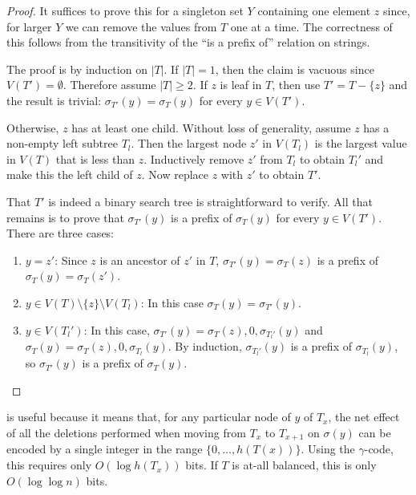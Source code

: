 \documentclass[kpfonts]{patmorin}
\begin{document}
\begin{proof}
  It suffices to prove this for a singleton set $Y$ containing one element $z$ since, for larger $Y$ we can remove the values from $T$ one at a time.  The correctness of this follows from the transitivity of the ``is a prefix of'' relation on strings.
  
  The proof is by induction on $|T|$. If $|T|=1$, then the claim is vacuous since $V(T')=\emptyset$.  Therefore assume $|T|\ge 2$.  If $z$ is leaf in $T$, then use $T'=T-\{z\}$ and the result is trivial: $\sigma_{T'}(y)=\sigma_T(y)$ for every $y\in V(T')$.  
  
  Otherwise, $z$ has at least one child.  Without loss of generality, assume $z$ has a non-empty left subtree $T_l$.  Then the largest node $z'$ in $V(T_l)$ is the largest value in $V(T)$ that is less than $z$. Inductively remove $z'$ from $T_l$ to obtain $T_l'$ and make this the left child of $z$.  Now replace $z$ with $z'$ to obtain $T'$.  
  
  That $T'$ is indeed a binary search tree is straightforward to verify.  All that remains is to prove that $\sigma_{T'}(y)$ is a prefix of $\sigma_T(y)$ for every $y\in V(T')$. There are three cases:
  \begin{enumerate}
    \item $y=z'$: Since $z$ is an ancestor of $z'$ in $T$, $\sigma_{T'}(y)=\sigma_T(z)$ is a prefix of $\sigma_T(y)=\sigma_T(z')$.  
    
    \item $y\in V(T)\setminus\{z\}\setminus V(T_l)$: In this case $\sigma_T(y)=\sigma_{T'}(y)$.  
    
    \item $y\in V(T_l')$: In this case, $\sigma_{T'}(y)=\sigma_{T}(z),0,\sigma_{T_l'}(y)$ and $\sigma_T(y)=\sigma_{T}(z),0,\sigma_{T_l}(y)$.  By induction, $\sigma_{T_l'}(y)$ is a prefix of $\sigma_{T_l}(y)$, so $\sigma_{T'}(y)$ is a prefix of $\sigma_T(y)$. \qedhere
  \end{enumerate}
\end{proof}

 is useful because it means that, for any particular node of $y$ of $T_x$, the net effect of all the deletions performed when moving from $T_x$ to $T_{x+1}$ on $\sigma(y)$ can be encoded by a single integer in the range $\{0,\ldots,h(T(x))\}$.  Using the $\gamma$-code, this requires only $O(\log h(T_x))$ bits.  If $T$ is at-all balanced, this is only $O(\log\log n)$ bits.
\end{document}
